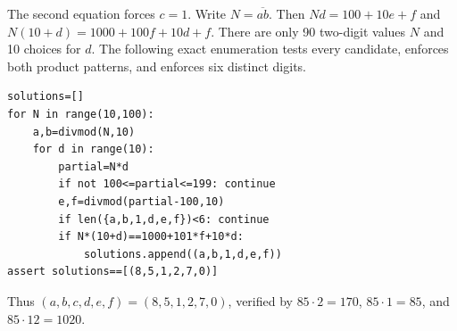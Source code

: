 The second equation forces $c=1$. Write $N=\overline{ab}$. Then $Nd=100+10e+f$ and $N(10+d)=1000+100f+10d+f$. There are only 90 two-digit values $N$ and 10 choices for $d$. The following exact enumeration tests every candidate, enforces both product patterns, and enforces six distinct digits.
\begin{verbatim}
solutions=[]
for N in range(10,100):
    a,b=divmod(N,10)
    for d in range(10):
        partial=N*d
        if not 100<=partial<=199: continue
        e,f=divmod(partial-100,10)
        if len({a,b,1,d,e,f})<6: continue
        if N*(10+d)==1000+101*f+10*d:
            solutions.append((a,b,1,d,e,f))
assert solutions==[(8,5,1,2,7,0)]
\end{verbatim}
Thus $\boxed{(a,b,c,d,e,f)=(8,5,1,2,7,0)}$, verified by $85\cdot2=170$, $85\cdot1=85$, and $85\cdot12=1020$.
